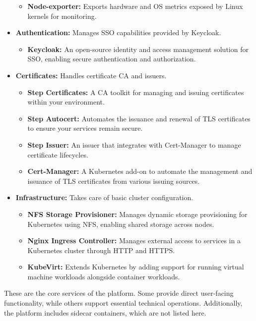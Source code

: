 \begin{itemize}
\begin{itemize}
        \item \textbf{Node-exporter:} Exports hardware and OS metrics exposed by Linux kernels for monitoring.
    \end{itemize}
    \item \textbf{Authentication:} Manages SSO capabilities provided by Keycloak.
    \begin{itemize}
        \item \textbf{Keycloak:} An open-source identity and access management solution for SSO, enabling secure authentication and authorization.
    \end{itemize}
    \item \textbf{Certificates:} Handles certificate CA and issuers.
    \begin{itemize}
        \item \textbf{Step Certificates:} A CA toolkit for managing and issuing certificates within your environment.
        \item \textbf{Step Autocert:} Automates the issuance and renewal of TLS certificates to ensure your services remain secure.
        \item \textbf{Step Issuer:} An issuer that integrates with Cert-Manager to manage certificate lifecycles.
        \item \textbf{Cert-Manager:} A Kubernetes add-on to automate the management and issuance of TLS certificates from various issuing sources.
    \end{itemize}
    \item \textbf{Infrastructure:} Takes care of basic cluster configuration.
    \begin{itemize}
        \item \textbf{NFS Storage Provisioner:} Manages dynamic storage provisioning for Kubernetes using NFS, enabling shared storage across nodes.
        \item \textbf{Nginx Ingress Controller:} Manages external access to services in a Kubernetes cluster through HTTP and HTTPS.
        \item \textbf{KubeVirt:} Extends Kubernetes by adding support for running virtual machine workloads alongside container workloads.
    \end{itemize}
\end{itemize}

These are the core services of the platform. Some provide direct user-facing functionality, while others support essential technical operations. Additionally, the platform includes sidecar containers, which are not listed here.

